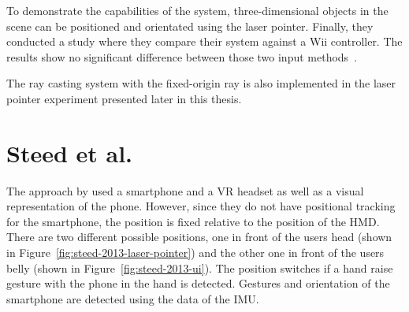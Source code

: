 To demonstrate the capabilities of the system, three-dimensional objects in the scene can be positioned and orientated using the laser pointer. Finally, they conducted a study where they compare their system against a Wii controller. The results show no significant difference between those two input methods~\cite[125]{Pietroszek.2014}.

The ray casting system with the fixed-origin ray is also implemented in the laser pointer experiment presented later in this thesis.%


\section{Steed et al.}\label{section:steed-2013}
The approach by \citeauthor{Steed.2013} used a smartphone and a \gls{VR} headset as well as a visual representation of the phone. However, since they do not have positional tracking for the smartphone, the position is fixed relative to the position of the \gls{HMD}. There are two different possible positions, one in front of the users head (shown in Figure~\ref{fig:steed-2013-laser-pointer}) and the other one in front of the users belly (shown in Figure~\ref{fig:steed-2013-ui}). The position switches if a hand raise gesture with the phone in the hand is detected. Gestures and orientation of the smartphone are detected using the data of the \gls{IMU}.

